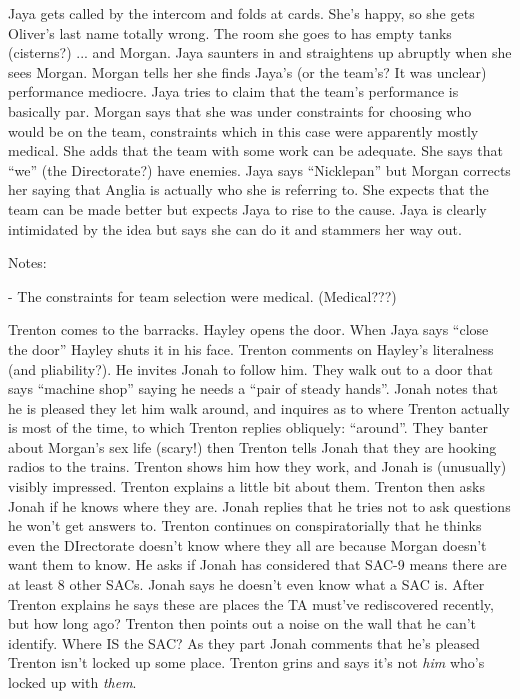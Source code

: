 Jaya gets called by the intercom and folds at cards.  She's happy, so she gets Oliver's last name totally wrong.  The room she goes to has empty tanks (cisterns?) ... and Morgan.  Jaya saunters in and straightens up abruptly when she sees Morgan.  Morgan tells her she finds Jaya's (or the team's?  It was unclear) performance mediocre.  Jaya tries to claim that the team's performance is basically par.  Morgan says that she was under constraints for choosing who would be on the team, constraints which in this case were apparently mostly medical.   She adds that the team with some work can be adequate.  She says that ``we'' (the Directorate?) have enemies.  Jaya says ``Nicklepan'' but Morgan corrects her saying that Anglia is actually who she is referring to.  She expects that the team can be made better but expects Jaya to rise to the cause.   Jaya is clearly intimidated by the idea but says she can do it and stammers her way out.



Notes:

- The constraints for team selection were medical.  (Medical???)



Trenton comes to the barracks.  Hayley opens the door.  When Jaya says ``close the door'' Hayley shuts it in his face.  Trenton comments on Hayley's literalness (and pliability?).  He invites Jonah to follow him.  They walk out to a door that says ``machine shop'' saying he needs a ``pair of steady hands''.  Jonah notes that he is pleased they let him walk around, and inquires as to where Trenton actually is most of the time, to which Trenton replies obliquely: ``around''.  They banter about Morgan's sex life (scary!) then Trenton tells Jonah that they are hooking radios to the trains.  Trenton shows him how they work, and Jonah is (unusually) visibly impressed.  Trenton explains a little bit about them.  Trenton then asks Jonah if he knows where they are.  Jonah replies that he tries not to ask questions he won't get answers to.  Trenton continues on conspiratorially that he thinks even the DIrectorate doesn't know where they all are because Morgan doesn't want them to know.  He asks if Jonah has considered that SAC-9 means there are at least 8 other SACs.  Jonah says he doesn't even know what a SAC is.  After Trenton explains he says these are places the TA must've rediscovered recently, but how long ago? Trenton then points out a noise on the wall that he can't identify.  Where IS the SAC?  As they part Jonah comments that he's pleased Trenton isn't locked up some place.  Trenton grins and says it's not \textit{him} who's locked up with \textit{them}.



